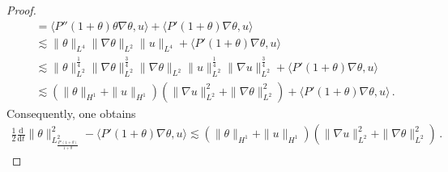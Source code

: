 \documentclass[reqno,11pt]{amsart}
\numberwithin{equation}{section}
\def\d{\mathrm{d}}
\begin{document}
\begin{proof}
\begin{equation}
\begin{aligned}
&= \langle P''(1+\theta)\theta\nabla\theta, u\rangle + \langle P'(1+\theta)\nabla\theta, u\rangle \\
&\lesssim \|\theta\|_{L^4} \|\nabla\theta\|_{L^2} \|u\|_{L^4} + \langle P'(1+\theta)\nabla\theta, u\rangle \\
&\lesssim \|\theta\|_{L^2}^{\frac{1}{4}} \|\nabla\theta\|_{L^2}^{\frac{3}{4}} \|\nabla\theta\|_{L^2} \|u\|_{L^2}^{\frac{1}{4}} \|\nabla u\|_{L^2}^{\frac{3}{4}} + \langle P'(1+\theta)\nabla\theta, u\rangle  \\
&\lesssim(\|\theta\|_{H^1}+ \|u\|_{H^1}) \left(\|\nabla u\|^2_{L^2} + \|\nabla\theta\|^2_{L^2}\right) + \langle P'(1+\theta)\nabla\theta, u\rangle \,.
\end{aligned}
\end{equation}
Consequently, one obtains
\begin{equation}\label{nd6}
\begin{aligned}
\frac{1}{2} \frac{\d}{\d t} \|\theta\|^2_{L^2_{\frac{P'(1+\theta)}{1+\theta}}} - \langle P'(1+\theta) \nabla \theta, u \rangle \lesssim (\|\theta\|_{H^1} + \|u\|_{H^1})(\|\nabla u\|^2_{L^2} + \|\nabla \theta\|^2_{L^2}) \,.
\end{aligned}
\end{equation}


\end{proof}
\end{document}
